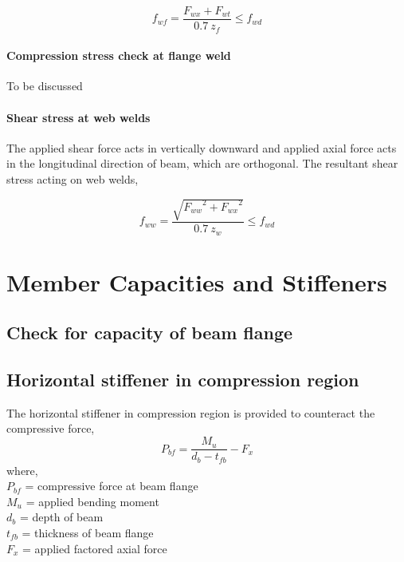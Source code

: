 \documentclass[11.5pt,a4paper,oneside]{report}
\begin{document}
\begin{Form}
\begin{equation}
	f_{wf} = \frac{F_{wx} + F_{wt}}{0.7~z_f} \leq f_{wd}
\end{equation}

\subsubsection{Compression stress check at flange weld}
To be discussed

\subsubsection{Shear stress at web welds}
The applied shear force acts in vertically downward and 
applied axial force acts in the longitudinal direction of beam,
which are orthogonal. 
The resultant shear stress acting on web welds,

\begin{equation}
	f_{ww} = \frac{\sqrt{{F_{ww}}^2 + {F_{wx}}^2}}{0.7~z_w} \leq f_{wd}
\end{equation}


\chapter{Member Capacities and Stiffeners}
\section{Check for capacity of beam flange}
\section{Horizontal stiffener in compression region}
The horizontal stiffener in compression region is provided to counteract
the compressive force, 
\begin{equation}
	P_{bf} = \frac{M_u}{d_b - t_{fb}} - F_x
\end{equation}
where, \\
\indent $P_{bf}$ = compressive force at beam flange \\ 
\indent ${M_u}$ = applied bending moment \\ 
\indent $d_b$ = depth of beam \\
\indent $t_{fb}$ = thickness of beam flange \\
\indent $F_x$ = applied factored axial force \\


\end{Form}
\end{document}
